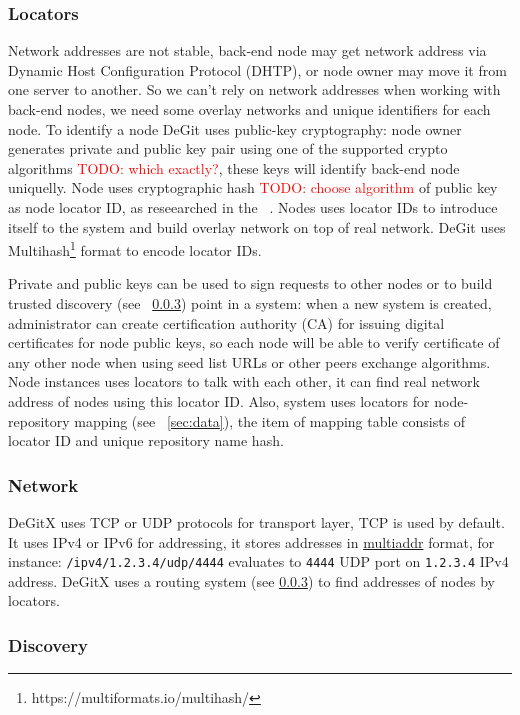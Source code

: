 \documentclass[12pt,oneside]{article}
\newcommand{\code}[1]{\texttt{#1}}
\newcommand{\todo}[1]{\textcolor{red}{TODO: #1}}
\begin{document}
\subsubsection{Locators}
\label{sec:locators}
Network addresses are not stable, back-end node may get network address via
Dynamic Host Configuration Protocol (DHTP), or node owner may move it from one server to another.
So we can't rely on network addresses when working with back-end nodes, we need some
overlay networks and unique identifiers for each node. To identify a node DeGit uses
public-key cryptography: node owner generates private and public key pair using one of the supported
crypto algorithms \todo{which exactly?}, these keys will identify back-end node uniquelly.
Node uses cryptographic hash \todo{choose algorithm} of public key as node locator ID,
as reseearched in the ~\cite{securebaserouting}. Nodes uses locator IDs to introduce
itself to the system and build overlay network on top of real network. DeGit uses
Multihash\footnote{https://multiformats.io/multihash/} format to encode locator IDs.

Private and public keys can be used to sign requests to other nodes or to build
trusted discovery (see ~\ref{sec:discovery}) point in a system: when a new system is created,
administrator can create certification authority (CA) for issuing digital certificates for node
public keys, so each node will be able to verify certificate of any other node when
using seed list URLs or other peers exchange algorithms. Node instances uses locators to talk
with each other, it can find real network address of nodes using this locator ID.
Also, system uses locators for node-repository mapping (see ~\ref{sec:data}),
the item of mapping table consists of locator ID and unique repository name hash.

\subsubsection{Network}
\label{sec:network}

DeGitX uses TCP or UDP protocols for transport layer, TCP is used by default. It uses IPv4 or IPv6 for addressing,
it stores addresses in \href{https://github.com/multiformats/multiaddr}{multiaddr} format, for instance:
\code{/ipv4/1.2.3.4/udp/4444} evaluates to \code{4444} UDP port on \code{1.2.3.4} IPv4 address.
DeGitX uses a routing system (see \ref{sec:discovery}) to find addresses of nodes by locators.

\subsubsection{Discovery}
\label{sec:discovery}
\end{document}
